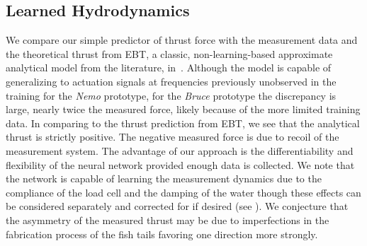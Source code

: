 \subsection{Learned Hydrodynamics}
\label{sec:learned_hydrodynamics}
We compare our simple predictor of thrust force with the measurement data and the theoretical thrust from EBT, a classic, non-learning-based approximate analytical model from the literature, in~. Although the model is capable of generalizing to actuation signals at frequencies previously unobserved in the training for the \emph{Nemo} prototype, for the \emph{Bruce} prototype the discrepancy is large, nearly twice the measured force, likely because of the more limited training data.
In comparing to the thrust prediction from EBT, we see that the analytical thrust is strictly positive. The negative measured force is due to recoil of the measurement system. The advantage of our approach is the differentiability and flexibility of the neural network provided enough data is collected. We note that the network is capable of learning the measurement dynamics due to the compliance of the load cell and the damping of the water though these effects can be considered separately and corrected for if desired (see ). We conjecture that the asymmetry of the measured thrust may be due to imperfections in the fabrication process of the fish tails favoring one direction more strongly.

